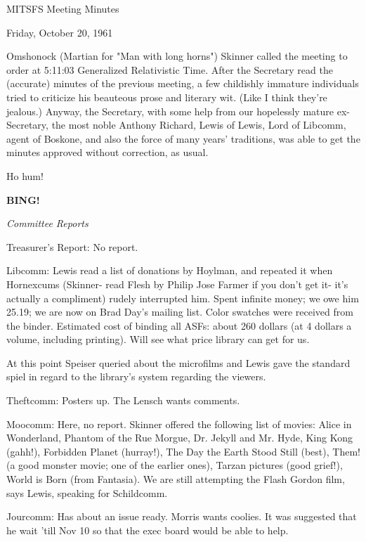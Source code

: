 \documentclass[12pt]{article}
\newcommand{\bing}{{\bf BING!} }
\newcommand{\goto}[1]{\bing \vskip 12pt \centerline{{\em{#1}}}}
\begin{document}
\begin{center}

MITSFS Meeting Minutes

Friday, October 20, 1961

\end{center}
 
\vspace{12pt}

\setlength{\parskip}{6pt}

\noindent
Omshonock (Martian for "Man with long horns") Skinner called the meeting to order at 5:11:03 Generalized Relativistic Time. After the Secretary read the (accurate) minutes of the previous meeting, a few childishly immature individuals tried to criticize his beauteous prose and literary wit. (Like I think they're jealous.) Anyway, the Secretary, with some help from our hopelessly mature ex-Secretary, the most noble Anthony Richard, Lewis of Lewis, Lord of Libcomm, agent of Boskone, and also the force of many years' traditions, was able to get the minutes approved without correction, as usual.

Ho hum!

\goto{Committee Reports}

Treasurer's Report: No report.

Libcomm: Lewis read a list of donations by Hoylman, and repeated it when Hornexcums (Skinner- read Flesh by Philip Jose Farmer if you don't get it- it's actually a compliment) rudely interrupted him. Spent infinite money; we owe him 25.19; we are now on Brad Day's mailing list. Color swatches were received from the binder. Estimated cost of binding all ASFs: about 260 dollars (at 4 dollars a volume, including printing). Will see what price library can get for us.

At this point Speiser queried about the microfilms and Lewis gave the standard spiel in regard to the library's system regarding the viewers.

Theftcomm: Posters up. The Lensch wants comments.

Moocomm: Here, no report. Skinner offered the following list of movies: Alice in Wonderland, Phantom of the Rue Morgue, Dr. Jekyll and Mr. Hyde, King Kong (gahh!), Forbidden Planet (hurray!), The Day the Earth Stood Still (best), Them! (a good monster movie; one of the earlier ones), Tarzan pictures (good grief!), World is Born (from Fantasia). We are still attempting the Flash Gordon film, says Lewis, speaking for Schildcomm.

Jourcomm: Has about an issue ready. Morris wants coolies. It was suggested that he wait 'till Nov 10 so that the exec board would be able to help.
\end{document}
